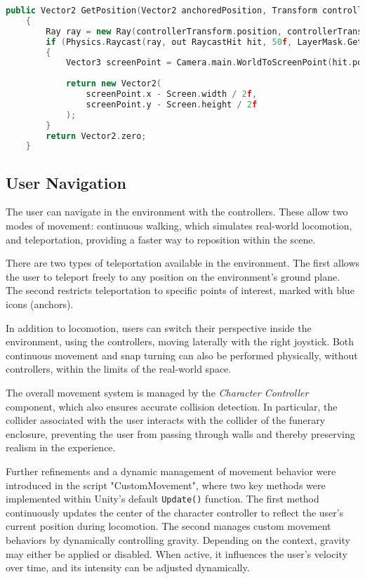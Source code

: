 \begin{lstlisting}[language=C++, caption={Method used to get the position that was pointed by the controller ray.}, label={lst:menu_raycast}]
    public Vector2 GetPosition(Vector2 anchoredPosition, Transform controllerTransform)
    {
        Ray ray = new Ray(controllerTransform.position, controllerTransform.forward);
        if (Physics.Raycast(ray, out RaycastHit hit, 50f, LayerMask.GetMask("Default")))
        {
            Vector3 screenPoint = Camera.main.WorldToScreenPoint(hit.point);
            
            return new Vector2(
                screenPoint.x - Screen.width / 2f,
                screenPoint.y - Screen.height / 2f
            );
        }
        return Vector2.zero;
    }
\end{lstlisting}


\subsection*{User Navigation}
The user can navigate in the environment with the controllers. 
These allow two modes of movement: continuous walking, which simulates real-world locomotion, and teleportation, providing a faster way to reposition within the scene.

There are two types of teleportation available in the environment. The first allows the user to teleport freely to any position on the environment’s ground plane. The second restricts teleportation to specific points of interest, marked with blue icons (anchors).

In addition to locomotion, users can switch their perspective inside the environment, using the controllers, moving laterally with the right joystick.
Both continuous movement and snap turning can also be performed physically, without controllers, within the limits of the real-world space.

The overall movement system is managed by the \emph{Character Controller} component, which also ensures accurate collision detection. In particular, the collider associated with the user interacts with the collider of the funerary enclosure, preventing the user from passing through walls and thereby preserving realism in the experience.

Further refinements and a dynamic management of movement behavior were introduced in the script "CustomMovement", where two key methods were implemented within Unity’s default \texttt{Update()} function.
The first method continuously updates the center of the character controller to reflect the user’s current position during locomotion. 
The second manages custom movement behaviors by dynamically controlling gravity. Depending on the context, gravity may either be applied or disabled. When active, it influences the user’s velocity over time, and its intensity can be adjusted dynamically.

